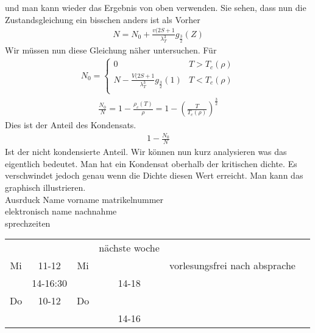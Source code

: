 und man kann wieder das Ergebnis von oben verwenden. Sie sehen, dass nun die
Zustandsgleichung ein bisschen anders ist als Vorher
%
\begin{align*}
  N = N_0 + \frac{v(2S+1}{\lambda_T^3} g_{\frac{3}{2}} (Z)
\end{align*}
%
Wir müssen nun diese Gleichung näher untersuchen. Für
%
\begin{align*}
  N_0 = 
  \begin{cases}
    0 &  T > T_c(\rho) \\
    N - \frac{V(2 S + 1}{\lambda_T^3} g_{\frac{3}{2}}(1) &  T < T_c(\rho)\\
  \end{cases} 
\end{align*}
%
%
\begin{align*}
  \frac{N_0 }{N} = 1 - \frac{\rho_c(T) }{\rho} = 1- \left( \frac{T}{T_c(\rho)} \right)^{\frac{3}{2}}
\end{align*}
%
Dies ist der Anteil des Kondensats.
%
\begin{align*}
  1  - \frac{N_0}{N} 
\end{align*}
%
Ist der nicht kondensierte Anteil. Wir können nun kurz analysieren was das
eigentlich bedeutet. Man hat ein Kondensat oberhalb der kritischen dichte.
Es verschwindet jedoch genau wenn die Dichte diesen Wert erreicht. Man 
kann das graphisch illustrieren. \\
Ausrduck Name vorname matrikelnummer\\
elektronisch name nachnahme \\
sprechzeiten 
\begin{table}[h!]
  \centering
  \begin{tabular}{c c c c c c}
     & & & nächste woche \\
    Mi & 11-12 & Mi & & vorlesungsfrei nach absprache \\
    & 14-16:30 & & 14-18 \\
    Do & 10-12 & Do & & \\
         &      &  & 14-16 \\
  \end{tabular}
\end{table}

